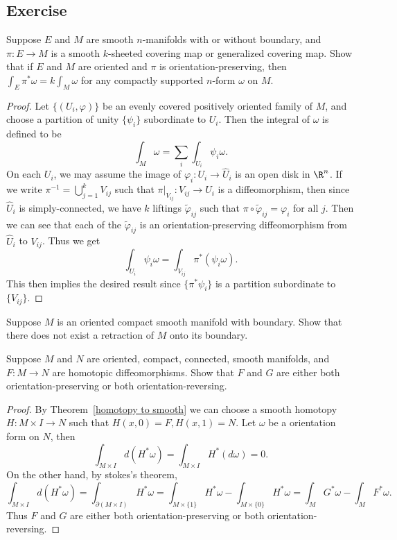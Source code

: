 \subsection{Exercise}
\begin{exercise}\label{int covering relation}
Suppose $E$ and $M$ are smooth $n$-manifolds with or without boundary, and $\pi:E\to M$ is a smooth $k$-sheeted covering map or generalized covering map. Show that if 
$E$ and $M$ are oriented and $\pi$ is orientation-preserving, then $\int_E\pi^*\omega=k\int_M\omega$ for any compactly supported $n$-form $\omega$ on $M$.
\end{exercise}
\begin{proof}
Let $\{(U_i,\varphi)\}$ be an evenly covered positively oriented family of $M$, and choose a partition of unity $\{\psi_i\}$ subordinate to $U_i$. Then the integral of 
$\omega$ is defined to be
\[\int_M\omega=\sum_{i}\int_{U_i}\psi_i\omega.\]
On each $U_i$, we may assume the image of $\varphi_i:U_i\to\widehat{U}_i$ is an open disk in $\R^n$. If we write $\pi^{-1}=\bigcup_{j=1}^{k}V_{ij}$ such that 
$\pi|_{V_{ij}}:V_{ij}\to U_i$ is a diffeomorphism, then since $\widehat{U}_i$ is simply-connected, we have $k$ liftings $\widetilde{\varphi}_{ij}$ such that 
$\pi\circ\widetilde{\varphi}_{ij}=\varphi_i$ for all $j$. Then we can see that each of the $\widetilde{\varphi}_{ij}$ is an orientation-preserving diffeomorphism from 
$\widehat{U}_i$ to $V_{ij}$. Thus we get
\[\int_{U_i}\psi_i\omega=\int_{V_{ij}}\pi^*(\psi_i\omega).\]
This then implies the desired result since $\{\pi^*\psi_i\}$ is a partition subordinate to $\{V_{ij}\}$.
\end{proof}
\begin{exercise}
Suppose $M$ is an oriented compact smooth manifold with boundary. Show that there does not exist a retraction of $M$ onto its boundary.
\end{exercise}
\begin{exercise}
Suppose $M$ and $N$ are oriented, compact, connected, smooth manifolds, and $F:M\to N$ are homotopic diffeomorphisms. Show that $F$ and $G$ are either both orientation-preserving or both orientation-reversing.
\end{exercise}
\begin{proof}
By Theorem~\ref{homotopy to smooth} we can choose a smooth homotopy $H:M\times I\to N$ such that $H(x,0)=F,H(x,1)=N$. Let $\omega$ be a orientation form on $N$, then
\[\int_{M\times I}d(H^*\omega)=\int_{M\times I}H^*(d\omega)=0.\]
On the other hand, by stokes's theorem,
\[\int_{M\times I}d(H^*\omega)=\int_{\partial(M\times I)}H^*\omega=\int_{M\times\{1\}}H^*\omega-\int_{M\times\{0\}}H^*\omega=\int_MG^*\omega-\int_MF^*\omega.\]
Thus $F$ and $G$ are either both orientation-preserving or both orientation-reversing.
\end{proof}
